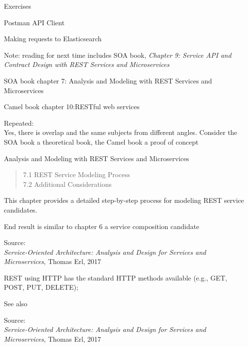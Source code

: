 \documentclass[Screen16to9,17pt]{foils}
\begin{document}
Exercises
\begin{list2}
\item Postman API Client
\item Making requests to Elasticsearch
\end{list2}

Note: reading for next time includes SOA book,
\emph{Chapter 9: Service API and Contract Design with
REST Services and Microservices}


\begin{list1}
\item SOA book chapter 7: Analysis and Modeling with REST Services and Microservices
\item Camel book chapter 10:RESTful web services

Repeated:\\
Yes, there is overlap and the same subjects from different angles. Consider the SOA book a theoretical book, the Camel book a proof of concept


\end{list1}



Analysis and Modeling with REST
Services and Microservices

\begin{quote}
7.1 REST Service Modeling Process\\
7.2 Additional Considerations
\end{quote}

\begin{list2}
\item This chapter provides a detailed step-by-step process for modeling REST service
candidates.
\item End result is similar to chapter 6 a service composition candidate
\end{list2}

Source: {\footnotesize\\
\emph{Service‑Oriented Architecture: Analysis and Design for Services and Microservices}, Thomas Erl, 2017}





\begin{list2}
\item REST using HTTP has the standard HTTP methods available (e.g., GET, POST, PUT, DELETE);
\item See also 
\end{list2}
Source: {\footnotesize\\
\emph{Service‑Oriented Architecture: Analysis and Design for Services and Microservices}, Thomas Erl, 2017}
\end{document}

